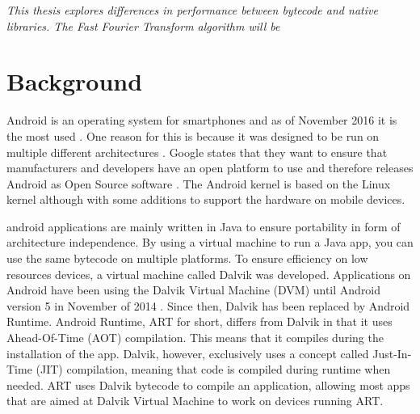 
\textit{This thesis explores differences in performance between bytecode and native libraries. The Fast Fourier Transform algorithm will be }


\section{Background}
Android is an operating system for smartphones and as of November 2016 it is the most used \cite{android:os:popularity}. One reason for this is because it was designed to be run on multiple different architectures \cite{android:os:devices}. Google states that they want to ensure that manufacturers and developers have an open platform to use and therefore releases Android as Open Source software \cite{android:os:opensource}. The Android kernel is based on the Linux kernel although with some additions to support the hardware on mobile devices.


\gls{android} applications are mainly written in Java to ensure portability in form of architecture independence. By using a virtual machine to run a Java app, you can use the same bytecode on multiple platforms. To ensure efficiency on low resources devices, a virtual machine called Dalvik was developed. Applications on Android have been using the Dalvik Virtual Machine (DVM) until Android version 5 \cite{android:dalvik} in November of 2014 \cite{android:dalvik:release}. Since then, Dalvik has been replaced by Android Runtime. Android Runtime, ART for short, differs from Dalvik in that it uses Ahead-Of-Time (AOT) compilation. This means that it compiles during the installation of the app. Dalvik, however, exclusively uses a concept called Just-In-Time (JIT) compilation, meaning that code is compiled during runtime when needed. ART uses Dalvik bytecode to compile an application, allowing most apps that are aimed at Dalvik Virtual Machine to work on devices running ART.

